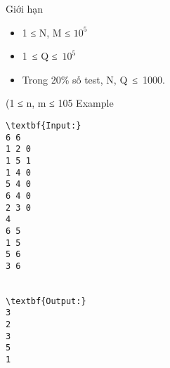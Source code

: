 Giới hạn  
\begin{itemize}
	\item     1 ≤ N, M ≤ $10^{5}$
	\item     1 ≤ Q ≤ $10^{5}$
	\item     Trong 20\% số test, N, Q ≤ 1000.   
\end{itemize}     (1 ≤ n, m ≤ 105
   Example  
\begin{verbatim}
\textbf{Input:}
6 6
1 2 0
1 5 1
1 4 0
5 4 0
6 4 0
2 3 0
4
6 5
1 5
5 6
3 6


\textbf{Output:}
3
2
3
5
1

\end{verbatim}